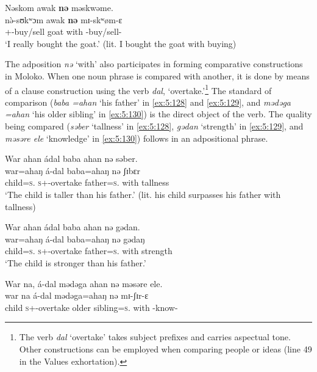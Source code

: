 \clearpage
\ea \label{ex:5:127}
Nəskom  awak  \textbf{nə}  məskwəme.\\
\gll  n\`{ə}-sʊkʷɔm    awak  \textbf{nə}  mɪ-skʷøm-ɛ\\
      {\oneS}+{\PFV}-buy/sell  goat  with  {\NOM}{}-buy/sell-{\CL}\\
\glt  ‘I really bought the goat.’ (lit. I bought the goat with buying)
\z

The adposition \textit{nə} ‘with’ also participates in forming comparative constructions in Moloko. When one noun phrase is compared with another, it is done by means of a clause construction using the verb \textit{dal}, ‘overtake.’\footnote{The verb \textit{dal} ‘overtake’ takes subject prefixes and carries aspectual tone. Other constructions can be employed when comparing people  or ideas (line 49 in the Values exhortation).} The standard of comparison (\textit{baba =ahan} ‘his father’ in \ref{ex:5:128} and \ref{ex:5:129}, and \textit{mədəga =ahan} ‘his older sibling’ in \ref{ex:5:130}) is the direct object of the verb. The quality being compared (\textit{səber} ‘tallness’ in \ref{ex:5:128}, \textit{gədan} ‘strength’ in \ref{ex:5:129}, and \textit{məsəre ele} ‘knowledge’ in \ref{ex:5:130}) follows in an adpositional phrase.  

\ea \label{ex:5:128}
War  ahan  ádal  baba  ahan  nə  səber.\\
\gll  war=ahaŋ     á-dal       baba=ahaŋ     nə   ʃɪbɛr\\
      child=\textsc{s}.{\POSS}   \textsc{s}+{\IFV}-overtake   father=\textsc{s}.{\POSS}  with  tallness\\
\glt  ‘The child is taller than his father.’ (lit. his child surpasses his father with tallness)  
\z

\ea \label{ex:5:129}
War  ahan  ádal  baba  ahan  nə  gədan.\\
\gll  war=ahaŋ    á-dal     baba=ahaŋ     nə   gədaŋ\\
      child=\textsc{s}.{\POSS}   \textsc{s}+{\IFV}-overtake   father=\textsc{s}.{\POSS}  with  strength\\
\glt  ‘The child is stronger than his father.’ 
\z

\ea \label{ex:5:130}
War  na,  á-dal  mədəga  ahan  nə  məsəre  ele.\\
\gll  war   na   á-dal        mədəga=ahaŋ     nə   mɪ{}-ʃɪr-ɛ \\    
      child   {\PSP}   \textsc{s}+{\IFV}-overtake    {older sibling}=\textsc{s}.{\POSS}  with   {\NOM}{}-know-{\CL}\\  
      
